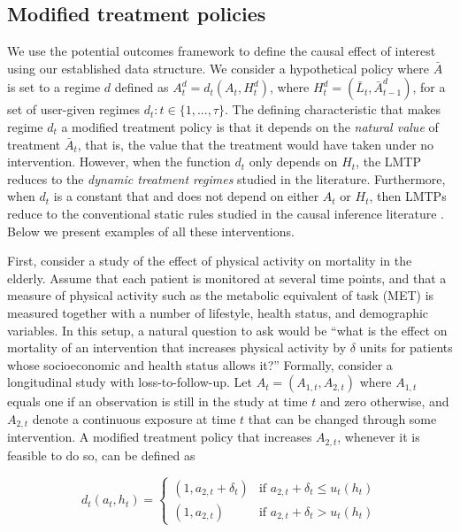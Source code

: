 \documentclass[twoside,11pt]{article}
\begin{document}
\hypertarget{modified-treatment-policies}{\subsection{Modified treatment policies}\label{modified-treatment-policies}}

We use the potential outcomes framework to define the causal effect of interest using our established data structure. We consider a hypothetical policy where $\bar{A}$ is set to a regime $d$ defined as $A^{d}_t = d_t(A_t, H^{d}_t)$, where $H^{d}_t = (\bar{L}_t, \bar{A}^{d}_{t - 1})$, for a set of user-given regimes $d_t:t \in \{1, ..., \tau\}$. The defining characteristic that makes regime $d_t$ a modified treatment policy is that it depends on the \emph{natural value} of treatment $\bar{A}_t$, that is, the value that the treatment would have taken under no intervention. However, when the function $d_t$ only depends on $H_t$, the LMTP reduces to the \textit{dynamic treatment regimes} studied in the literature. Furthermore, when $d_t$ is a constant that and does not depend on either $A_t$ or $H_t$, then LMTPs reduce to the conventional static rules studied in the causal inference literature \citep[e.g.,][]{bang2005doubly, van2011targeted}. Below we present examples of all these interventions.

First, consider a study of the effect of physical activity on mortality in the elderly. Assume that each patient is monitored at several time points, and that a measure of physical activity such as the metabolic equivalent of task (MET) \citep{mendes2018metabolic} is measured together with a number of lifestyle, health status, and demographic variables. In this setup, a natural question to ask would be ``what is the effect on mortality of an intervention that increases physical activity by $\delta$ units for patients whose socioeconomic and health status allows it?'' Formally, consider a longitudinal study with loss-to-follow-up. Let $A_t = (A_{1, t}, A_{2, t})$ where $A_{1, t}$ equals one if an observation is still in the study at time $t$ and zero otherwise, and $A_{2, t}$ denote a continuous exposure at time $t$ that can be changed through some intervention. A modified treatment policy that increases $A_{2,t}$, whenever it is feasible to do so, can be defined as

\begin{equation}\label{eq:mtp}
d_t(a_t,h_t)=
\begin{cases}
  (1, a_{2,t} + \delta_t) & \text{if } a_{2,t} + \delta_t \leq u_t(h_t)  \\
  (1, a_{2,t}) & \text{if } a_{2,t} + \delta_t > u_t(h_t)
\end{cases}
\end{equation}
\end{document}
